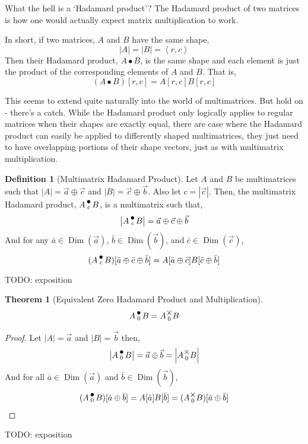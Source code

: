 \documentclass[12pt]{book}
\theoremstyle{plain}
\newtheorem{theorem}{Theorem}[chapter]
\theoremstyle{definition}
\newtheorem{definition}{Definition}[chapter]
\theoremstyle{ppart}
\theoremstyle{case}
\theoremstyle{solution}
\DeclareMathOperator{\Dim}{Dim}
\newcommand{\mmult}[1]{\text{\raisebox{1ex}{$\underset{#1}{\times}$}}}
\newcommand{\dmult}[1]{\text{\raisebox{1ex}{$\underset{#1}{\,\bullet\,}$}}}
\newcommand{\shape}[1]{\left|#1\right|}
\begin{document}
What the hell is a `Hadamard product'? The Hadamard product \cite{wiki:hadamard}
of two matrices is how one would actually expect matrix multiplication to work.

In short, if two matrices, $A$ and $B$ have the same shape,
\[ \shape{A} = \shape{B} = \left<r,c\right> \]
Then their Hadamard product, $A \bullet B$, is the same shape and each element
is just the product of the corresponding elements of $A$ and $B$. That is,
\[ (A \bullet B)[r,c] = A[r,c] B[r,c] \]

This seems to extend quite naturally into the world of multimatrices.
But hold on - there's a catch. While the Hadamard product only logically applies
to regular matrices when their shapes are exactly equal, there are case where
the Hadamard product can easily be applied to differently shaped multimatrices,
they just need to have overlapping portions of their shape vectors, just as
with multimatrix multiplication.

\begin{definition}[Multimatrix Hadamard Product]
\label{multi_had_prod}
Let $A$ and $B$ be multimatrices such that $\shape{A} = \vec{a} \oplus \vec{c}$
and $\shape{B} = \vec{c} \oplus \vec{b}$. Also let $c = \shape{\vec{c}}$.
Then, the multimatrix Hadamard product, $A \dmult{c} B$, is a multimatrix
such that,
\[ \shape{A \dmult{c} B} = \vec{a} \oplus \vec{c} \oplus \vec{b} \]
And for any $\bar{a} \in \Dim(\vec{a})$, $\bar{b} \in \Dim(\vec{b})$,
and $\bar{c} \in \Dim(\vec{c})$,
\[
  (A \dmult{c} B)[\bar{a} \oplus \bar{c} \oplus \bar{b}]
  = A[\bar{a} \oplus \bar{c}] B[\bar{c} \oplus \bar{b}]
\]
\end{definition}

TODO: exposition

\begin{theorem}[Equivalent Zero Hadamard Product and Multiplication]
\[ A \dmult{0} B = A \mmult{0} B \]
\end{theorem}
\begin{proof}
Let $\shape{A} = \vec{a}$ and $\shape{B} = \vec{b}$ then,
\[ \shape{A \dmult{0} B} = \vec{a} \oplus \vec{b} = \shape{A \mmult{0} B} \]
And for all $\bar{a} \in \Dim(\vec{a})$ and $\bar{b} \in \Dim(\vec{b})$,
\[ (A \dmult{0} B)[\bar{a} \oplus \bar{b}] = A[\bar{a}] B[\bar{b}] = (A \mmult{0} B)[\bar{a} \oplus \bar{b}] \]
\end{proof}

TODO: exposition
\end{document}
